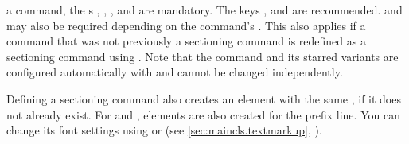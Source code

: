 \begin{description}
  a command, the  s
  , , , and 
  are mandatory. The keys
  , and 
  are recommended.  and
   may also be required depending on the command's
  . This also applies if a command that was not previously a
  sectioning command is redefined as a sectioning command using
  . Note that the
   command and its starred variants are configured automatically
  with  and cannot be changed independently.
\end{description}
Defining a sectioning command also creates an element with the same
, if it does not already exist. For  and
, elements are also created for the prefix line. You can change
its font settings using  or
 (see \autoref{sec:maincls.textmarkup},
).

